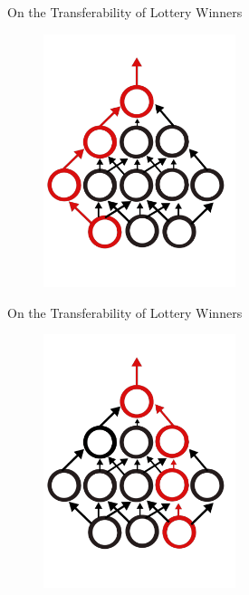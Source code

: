 \documentclass{beamer}
\begin{document}
\begin{frame}{On the Transferability of Lottery Winners}

	\begin{figure}
		\includegraphics[width=0.5\textwidth]{figures/random_ticket_1.pdf}
	\end{figure}

\end{frame}

\begin{frame}{On the Transferability of Lottery Winners}

	\begin{figure}
		\includegraphics[width=0.5\textwidth]{figures/random_ticket_2.pdf}
	\end{figure}

\end{frame}
\end{document}

